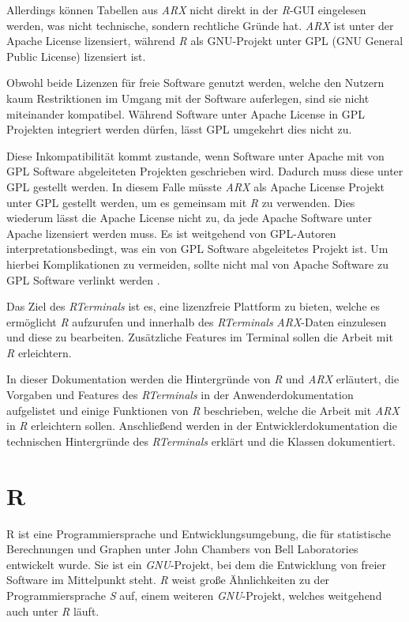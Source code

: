 \documentclass[a4paper, 12pt]{report} %
\begin{document}
Allerdings können Tabellen aus \textit{ARX} nicht direkt in der \textit{R}-GUI eingelesen werden, was nicht technische, sondern rechtliche Gründe hat. \textit{ARX} ist unter der Apache License lizensiert, während \textit{R} als GNU-Projekt unter GPL (GNU General Public License) lizensiert ist. 

Obwohl beide Lizenzen für freie Software genutzt werden, welche den Nutzern kaum Restriktionen im Umgang mit der Software auferlegen, sind sie nicht miteinander kompatibel. Während Software unter Apache License in GPL Projekten integriert werden dürfen, lässt GPL umgekehrt dies nicht zu. 

Diese Inkompatibilität kommt zustande, wenn Software unter Apache mit von GPL Software abgeleiteten Projekten geschrieben wird. Dadurch muss diese unter GPL gestellt werden. In diesem Falle müsste \textit{ARX} als Apache License Projekt unter GPL gestellt werden, um es gemeinsam mit \textit{R} zu verwenden. Dies wiederum lässt die Apache License nicht zu, da jede Apache Software unter Apache lizensiert werden muss. Es ist weitgehend von GPL-Autoren interpretationsbedingt, was ein von GPL Software abgeleitetes Projekt ist. Um hierbei Komplikationen zu vermeiden, sollte nicht mal von Apache Software zu GPL Software verlinkt werden \cite{license}. 

Das Ziel des \textit{RTerminals} ist es, eine lizenzfreie Plattform zu bieten, welche es ermöglicht \textit{R} aufzurufen und innerhalb des \textit{RTerminals} \textit{ARX}-Daten einzulesen und diese zu bearbeiten. Zusätzliche Features im Terminal sollen die Arbeit mit \textit{R} erleichtern. 

In dieser Dokumentation werden die Hintergründe von \textit{R} und \textit{ARX} erläutert, die Vorgaben und Features des \textit{RTerminals} in der Anwenderdokumentation aufgelistet und einige Funktionen von \textit{R} beschrieben, welche die Arbeit mit \textit{ARX} in \textit{R} erleichtern sollen. Anschließend werden in der Entwicklerdokumentation die technischen Hintergründe des \textit{RTerminals} erklärt und die Klassen dokumentiert.

\section*{R}\label{r}
R ist eine Programmiersprache und Entwicklungsumgebung, die für statistische Berechnungen und Graphen unter John Chambers von Bell Laboratories entwickelt wurde. Sie ist ein \textit{GNU}-Projekt, bei dem die Entwicklung von freier Software im Mittelpunkt steht. \textit{R} weist große Ähnlichkeiten zu der Programmiersprache \textit{S} auf, einem weiteren \textit{GNU}-Projekt, welches weitgehend auch unter \textit{R} läuft. \cite{rproject}
\end{document}
